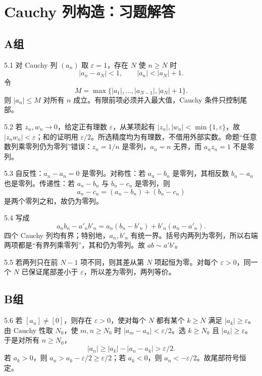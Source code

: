 \chapter{Cauchy 列构造：习题解答}

\section*{A组}

\begin{solution}{5.1}
对 Cauchy 列 \((a_n)\) 取 \(\varepsilon=1\)，存在 \(N\) 使 \(n\ge N\) 时
\[
 |a_n-a_N|<1,\qquad |a_n|<|a_N|+1.
\]
令
\[
 M=\max\{|a_1|,\ldots,|a_{N-1}|,|a_N|+1\}.
\]
则 \(|a_n|\le M\) 对所有 \(n\) 成立。有限前项必须并入最大值，Cauchy 条件只控制尾部。
\end{solution}
\begin{solution}{5.2}
若 \(z_n,w_n\to0\)，给定正有理数 \(\varepsilon\)，从某项起有 \(|z_n|,|w_n|<\min\{1,\varepsilon\}\)，故 \(|z_nw_n|<\varepsilon\)；和的证明用 \(\varepsilon/2\)。所选精度均为有理数，不借用外部实数。命题“任意数列乘零列仍为零列”错误：\(z_n=1/n\) 是零列，\(a_n=n\) 无界，而 \(a_nz_n=1\) 不是零列。
\end{solution}

\begin{solution}{5.3}
自反性：\(a_n-a_n=0\) 是零列。对称性：若 \(a_n-b_n\) 是零列，其相反数 \(b_n-a_n\) 也是零列。传递性：若 \(a_n-b_n\) 与 \(b_n-c_n\) 是零列，则
\[
 a_n-c_n=(a_n-b_n)+(b_n-c_n)
\]
是两个零列之和，故仍为零列。
\end{solution}

\begin{solution}{5.4}
写成
\[
 a_nb_n-a'_nb'_n=a_n(b_n-b'_n)+b'_n(a_n-a'_n).
\]
四个 Cauchy 列均有界；特别地，\(a_n,b'_n\) 有统一界。括号内两列为零列，所以右端两项都是“有界列乘零列”，其和仍为零列。故 \(ab\sim a'b'\)。
\end{solution}

\begin{solution}{5.5}
若两列只在前 \(N-1\) 项不同，则其差从第 \(N\) 项起恒为零。对每个 \(\varepsilon>0\)，同一个 \(N\) 已保证尾部差小于 \(\varepsilon\)，所以差为零列，两列等价。
\end{solution}

\section*{B组}

\begin{solution}{5.6}
若 \([a_n]\ne[0]\)，则存在 \(\varepsilon>0\)，使对每个 \(N\) 都有某个 \(k\ge N\) 满足 \(|a_k|\ge\varepsilon\)。由 Cauchy 性取 \(N_0\)，使 \(m,n\ge N_0\) 时 \(|a_m-a_n|<\varepsilon/2\)。选 \(k\ge N_0\) 且 \(|a_k|\ge\varepsilon\)。于是对所有 \(n\ge N_0\)，
\[
 |a_n|\ge|a_k|-|a_n-a_k|>\varepsilon/2.
\]
若 \(a_k>0\)，则 \(a_n>a_k-\varepsilon/2\ge\varepsilon/2\)；若 \(a_k<0\)，则 \(a_n<-\varepsilon/2\)。故尾部符号恒定。
\end{solution}

